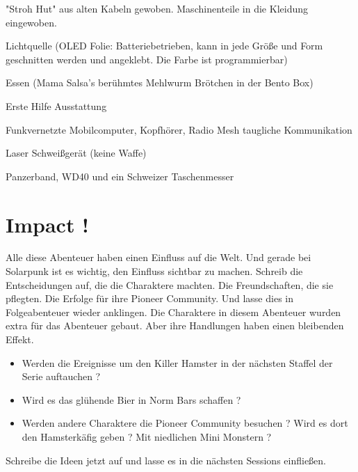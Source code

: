 \begin{npcBox}[title=Spark]
    \begin{stressSection}
    \end{stressSection}
    \begin{tabularx}{\textwidth}{ XX }
    \end{tabularx}

    \begin{consequences}
    \item {}
    \item {}
    \item {}
    \end{consequences}

    \begin{npcDescription}
    "Stroh Hut" aus alten Kabeln gewoben. Maschinenteile in die Kleidung eingewoben.
    \end{npcDescription}


    \begin{equipment}
    \item Lichtquelle (OLED Folie: Batteriebetrieben, kann in jede Größe und Form geschnitten werden und angeklebt. Die Farbe ist programmierbar)
    \item Essen (Mama Salsa's berühmtes Mehlwurm Brötchen in der Bento Box)
    \item Erste Hilfe Ausstattung
    \item Funkvernetzte Mobilcomputer, Kopfhörer, Radio Mesh taugliche Kommunikation
    \item Laser Schweißgerät (keine Waffe)
    \item Panzerband, WD40 und ein Schweizer Taschenmesser
    \end{equipment}
\end{npcBox}

\newpage

\section{Impact !}

Alle diese Abenteuer haben einen Einfluss auf die Welt. Und gerade bei Solarpunk ist es wichtig, den Einfluss sichtbar zu machen. Schreib die Entscheidungen auf, die die Charaktere machten. Die Freundschaften, die sie pflegten. Die Erfolge für ihre Pioneer Community. Und lasse dies in Folgeabenteuer wieder anklingen.
Die Charaktere in diesem Abenteuer wurden extra für das Abenteuer gebaut. Aber ihre Handlungen haben einen bleibenden Effekt.

\begin{itemize}
    \item Werden die Ereignisse um den Killer Hamster in der nächsten Staffel der Serie auftauchen ?
    \item Wird es das glühende Bier in Norm Bars schaffen ?
    \item Werden andere Charaktere die Pioneer Community besuchen ? Wird es dort den Hamsterkäfig geben ? Mit niedlichen Mini Monstern ?
\end{itemize}

Schreibe die Ideen jetzt auf und lasse es in die nächsten Sessions einfließen.
